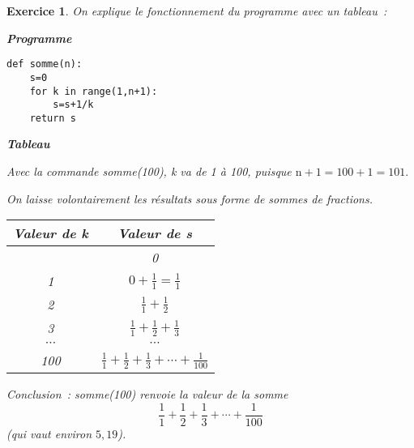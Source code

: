 \documentclass[10pt]{article}
\newtheorem{exo}{Exercice}
\begin{document}
\begin{exo}

On explique le fonctionnement du programme avec un tableau~:

\medskip

\setlength{\columnseprule}{1pt}

\begin{multicols}{2}

\begin{center}
\textbf{Programme}
\end{center}

\begin{lstlisting}
def somme(n):
	s=0
	for k in range(1,n+1):
		s=s+1/k
	return s
\end{lstlisting}



\vspace*{3cm}


\columnbreak

\begin{center}
\textbf{Tableau}
\end{center}

Avec la commande somme(100), k va de 1 à 100, puisque $\text{n}+1=100+1=101.$

\medskip

On laisse volontairement les résultats sous forme de sommes de fractions.

\medskip

\begin{center}

\renewcommand{\arraystretch}{1.25}

\begin{tabular}{|c|c|} \hline
\textbf{Valeur de k}& \textbf{Valeur de s}\\ \hline
\cellcolor{gray}& 0\\ \hline
1& $0+\frac{1}{1}=\frac{1}{1}$\\ \hline
2&$\frac{1}{1}+\frac{1}{2}$\\ \hline
3&$\frac{1}{1}+\frac{1}{2}+\frac{1}{3}$\\ \hline
$\cdots$&$\cdots$\\ \hline
100&$\frac{1}{1}+\frac{1}{2}+\frac{1}{3}+\cdots+\frac{1}{100}$\\ \hline
\end{tabular}
\end{center}


\end{multicols}

\medskip

Conclusion~: somme(100) renvoie la valeur de la somme
\[\frac{1}{1}+\frac{1}{2}+\frac{1}{3}+\cdots+\frac{1}{100}\] 
(qui vaut environ $5,19$).




\end{exo}
\end{document}
